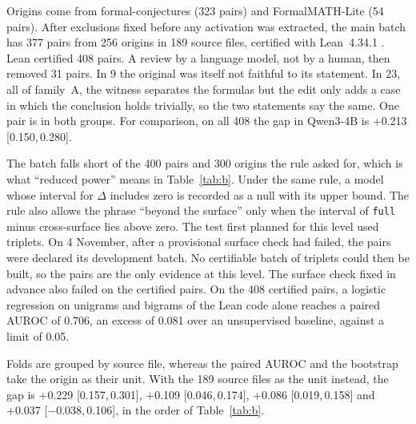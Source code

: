 \documentclass[10pt]{article}
\newcommand{\vr}[1]{\texttt{#1}}
\newcommand{\D}{\Delta}
\newcommand{\ic}[2]{[#1,\,#2]}
\begin{document}
Origins come from formal-conjectures \citep{fc,fcpaper} (323 pairs) and
FormalMATH-Lite \citep{formalmath} (54 pairs). After exclusions fixed before any activation was extracted, the main
batch has 377 pairs from 256 origins in 189 source files, certified with Lean~4.34.1 \citep{lean4,mathlib}.
Lean certified 408 pairs. A review by a language model, not by a human, then removed 31 pairs. In 9 the original was itself not faithful to its
statement. In 23, all of family~A, the witness separates the formulas but the edit only adds a case in which the
conclusion holds trivially, so the two statements say the same. One pair is in both groups. For
comparison, on all 408 the gap in Qwen3-4B is +0.213 \ic{0.150}{0.280}.

The batch falls short of the 400 pairs and 300 origins the rule asked for, which is what ``reduced power'' means in
Table~\ref{tab:b}. Under the same rule, a model whose interval for $\D$ includes zero is recorded as a null with its
upper bound. The rule also allows the phrase ``beyond the surface'' only when the interval of \vr{full} minus
cross-surface lies above zero. The test first planned for this level used triplets. On 4 November, after a provisional surface check had failed, the pairs were declared its development batch. No certifiable batch of triplets could then be built, so the pairs are the only evidence at this level. The surface check fixed in advance also failed on the certified pairs. On the 408 certified pairs, a logistic regression on unigrams and
bigrams of the Lean code alone reaches a paired AUROC of 0.706, an excess of 0.081 over an unsupervised baseline, against a
limit of 0.05.

Folds are grouped by source file, whereas the paired AUROC and the bootstrap take the origin as their unit. With the
189 source files as the unit instead, the gap is +0.229 \ic{0.157}{0.301}, +0.109 \ic{0.046}{0.174}, +0.086
\ic{0.019}{0.158} and +0.037 \ic{−0.038}{0.106}, in the order of Table~\ref{tab:b}.
\end{document}
